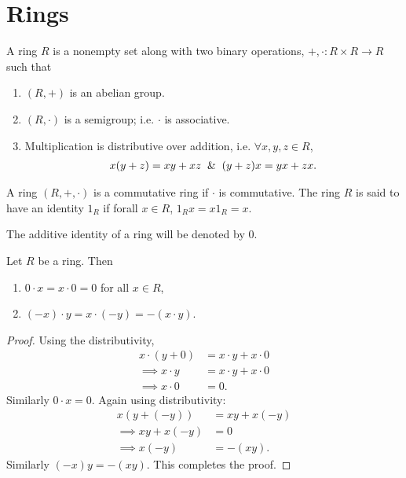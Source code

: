 \section{Rings}
\begin{definition}
  A ring $R$ is a nonempty set along with two binary operations, $+,\cdot : R\times R \to R$ such that
  \begin{enumerate}
    \item $(R,+)$ is an abelian group.
    \item $(R, \cdot)$ is a semigroup; i.e. $\cdot$ is associative.
    \item Multiplication is distributive over addition, i.e. $\forall x,y,z\in R$,
      \begin{align*}
        x(y+z) = xy + xz \And (y+z)x = yx + zx.
      \end{align*}
  \end{enumerate}
\end{definition}
\begin{definition}
  A ring $(R,+, \cdot)$ is a commutative ring if $\cdot$ is commutative. The ring $R$ is said to have an identity $1_R$ if forall $x\in R$, $1_Rx = x1_R = x$. 
\end{definition}
\begin{notation}
  The additive identity of a ring will be denoted by $0$.
\end{notation}
\begin{proposition}
  Let $R$ be a ring. Then
  \begin{enumerate}
    \item $0\cdot x = x\cdot 0 = 0$ for all $x\in R$,
    \item $(-x)\cdot y = x\cdot (-y) = -(x\cdot y)$.
  \end{enumerate}
\end{proposition}
\begin{proof}
  Using the distributivity,
  \begin{align*}
    x\cdot (y +0) &= x\cdot y + x\cdot0\\
    \implies x\cdot y &= x\cdot y + x\cdot 0\\
    \implies x\cdot 0 &= 0.
  \end{align*}
  Similarly $0\cdot x = 0$. Again using distributivity:
  \begin{align*}
    x(y + (-y)) &= xy + x(-y)\\
    \implies xy + x(-y) &= 0\\
    \implies x(-y) &= -(xy).
  \end{align*}
  Similarly $(-x)y = -(xy)$. This completes the proof.
\end{proof}
